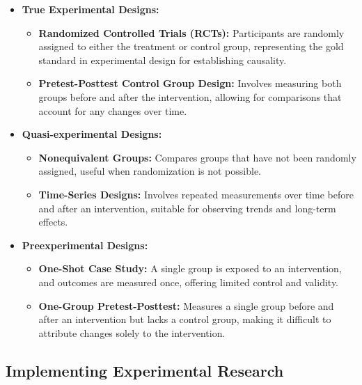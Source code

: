 \documentclass[
]{book}
\providecommand{\tightlist}{%
  \setlength{\itemsep}{0pt}\setlength{\parskip}{0pt}}
\begin{document}
\begin{itemize}
\tightlist
\item
  \textbf{True Experimental Designs:}

  \begin{itemize}
  \tightlist
  \item
    \textbf{Randomized Controlled Trials (RCTs):} Participants are randomly assigned to either the treatment or control group, representing the gold standard in experimental design for establishing causality.
  \item
    \textbf{Pretest-Posttest Control Group Design:} Involves measuring both groups before and after the intervention, allowing for comparisons that account for any changes over time.
  \end{itemize}
\item
  \textbf{Quasi-experimental Designs:}

  \begin{itemize}
  \tightlist
  \item
    \textbf{Nonequivalent Groups:} Compares groups that have not been randomly assigned, useful when randomization is not possible.
  \item
    \textbf{Time-Series Designs:} Involves repeated measurements over time before and after an intervention, suitable for observing trends and long-term effects.
  \end{itemize}
\item
  \textbf{Preexperimental Designs:}

  \begin{itemize}
  \tightlist
  \item
    \textbf{One-Shot Case Study:} A single group is exposed to an intervention, and outcomes are measured once, offering limited control and validity.
  \item
    \textbf{One-Group Pretest-Posttest:} Measures a single group before and after an intervention but lacks a control group, making it difficult to attribute changes solely to the intervention.
  \end{itemize}
\end{itemize}

\hypertarget{implementing-experimental-research}{%
\subsection*{Implementing Experimental Research}\label{implementing-experimental-research}}
\end{document}
